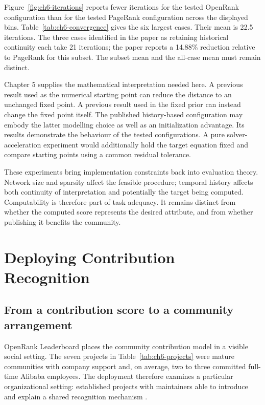 


Figure~\ref{fig:ch6-iterations} reports fewer iterations for the tested OpenRank configuration than for the tested PageRank configuration across the displayed bins. Table~\ref{tab:ch6-convergence} gives the six largest cases. Their mean is 22.5 iterations. The three cases identified in the paper as retaining historical continuity each take 21 iterations; the paper reports a 14.88\% reduction relative to PageRank for this subset. The subset mean and the all-case mean must remain distinct.

Chapter 5 supplies the mathematical interpretation needed here. A previous result used as the numerical starting point can reduce the distance to an unchanged fixed point. A previous result used in the fixed prior can instead change the fixed point itself. The published history-based configuration may embody the latter modelling choice as well as an initialization advantage. Its results demonstrate the behaviour of the tested configurations. A pure solver-acceleration experiment would additionally hold the target equation fixed and compare starting points using a common residual tolerance.

These experiments bring implementation constraints back into evaluation theory. Network size and sparsity affect the feasible procedure; temporal history affects both continuity of interpretation and potentially the target being computed. Computability is therefore part of task adequacy. It remains distinct from whether the computed score represents the desired attribute, and from whether publishing it benefits the community.

\section{Deploying Contribution Recognition}
\label{sec:ch6-deployment}

\subsection{From a contribution score to a community arrangement}
OpenRank Leaderboard places the community contribution model in a visible social setting. The seven projects in Table~\ref{tab:ch6-projects} were mature communities with company support and, on average, two to three committed full-time Alibaba employees. The deployment therefore examines a particular organizational setting: established projects with maintainers able to introduce and explain a shared recognition mechanism \citep[Section 3.1]{zhao2024}.

